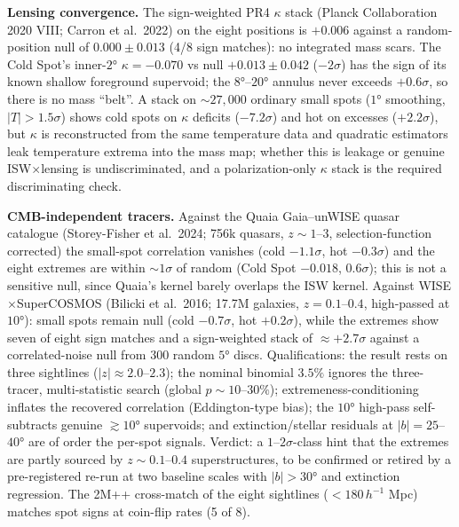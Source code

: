 \documentclass[
]{article}
\begin{document}
\textbf{Lensing convergence.} The sign-weighted PR4 \(\kappa\) stack
(Planck Collaboration 2020 VIII; Carron et al.~2022) on the eight
positions is \(+0.006\) against a random-position null of
\(0.000 \pm 0.013\) (4/8 sign matches): no integrated mass scars. The
Cold Spot's inner-\(2°\) \(\kappa = -0.070\) vs null
\(+0.013 \pm 0.042\) (\(-2\sigma\)) has the sign of its known shallow
foreground supervoid; the \(8°\)--\(20°\) annulus never exceeds
\(+0.6\sigma\), so there is no mass ``belt''. A stack on
\(\sim\!27{,}000\) ordinary small spots (\(1°\) smoothing,
\(|T| > 1.5\sigma\)) shows cold spots on \(\kappa\) deficits
(\(-7.2\sigma\)) and hot on excesses (\(+2.2\sigma\)), but \(\kappa\) is
reconstructed from the same temperature data and quadratic estimators
leak temperature extrema into the mass map; whether this is leakage or
genuine ISW\(\times\)lensing is undiscriminated, and a polarization-only
\(\kappa\) stack is the required discriminating check.

\textbf{CMB-independent tracers.} Against the Quaia Gaia--unWISE quasar
catalogue (Storey-Fisher et al.~2024; 756k quasars, \(z \sim 1\)--\(3\),
selection-function corrected) the small-spot correlation vanishes (cold
\(-1.1\sigma\), hot \(-0.3\sigma\)) and the eight extremes are within
\(\sim\!1\sigma\) of random (Cold Spot \(-0.018\), \(0.6\sigma\)); this
is not a sensitive null, since Quaia's kernel barely overlaps the ISW
kernel. Against WISE\(\times\)SuperCOSMOS (Bilicki et al.~2016; 17.7M
galaxies, \(z = 0.1\)--\(0.4\), high-passed at \(10°\)): small spots
remain null (cold \(-0.7\sigma\), hot \(+0.2\sigma\)), while the
extremes show seven of eight sign matches and a sign-weighted stack of
\(\approx +2.7\sigma\) against a correlated-noise null from 300 random
\(5°\) discs. Qualifications: the result rests on three sightlines
(\(|z| \approx 2.0\)--\(2.3\)); the nominal binomial \(3.5\%\) ignores
the three-tracer, multi-statistic search (global
\(p \sim 10\)--\(30\%\)); extremeness-conditioning inflates the
recovered correlation (Eddington-type bias); the \(10°\) high-pass
self-subtracts genuine \(\gtrsim 10°\) supervoids; and
extinction/stellar residuals at \(|b| = 25\)--\(40°\) are of order the
per-spot signals. Verdict: a \(1\)--\(2\sigma\)-class hint that the
extremes are partly sourced by \(z \sim 0.1\)--\(0.4\) superstructures,
to be confirmed or retired by a pre-registered re-run at two baseline
scales with \(|b| > 30°\) and extinction regression. The 2M++
cross-match of the eight sightlines (\(< 180\,h^{-1}\) Mpc) matches spot
signs at coin-flip rates (5 of 8).
\end{document}
